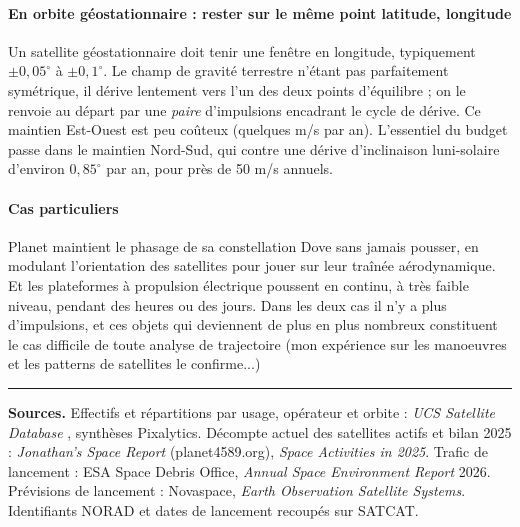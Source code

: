 \documentclass[11pt]{article}
\begin{document}
\paragraph{En orbite géostationnaire : rester sur le même point latitude, longitude} Un satellite géostationnaire doit tenir une fenêtre en longitude, typiquement $\pm 0{,}05^\circ$ à $\pm 0{,}1^\circ$. 
Le champ de gravité terrestre n'étant pas parfaitement symétrique, il dérive lentement vers l'un des deux points d'équilibre ; on le renvoie au départ par une \emph{paire} d'impulsions encadrant le cycle de dérive. Ce maintien Est-Ouest est peu coûteux (quelques m/s par an). L'essentiel du budget passe dans le maintien Nord-Sud, qui contre une dérive d'inclinaison luni-solaire d'environ $0{,}85^\circ$ par an, pour près de 50 m/s annuels.

\paragraph{Cas particuliers} 
Planet maintient le phasage de sa constellation Dove sans jamais pousser, en modulant l'orientation des satellites pour jouer sur leur traînée aérodynamique. 
Et les plateformes à propulsion électrique poussent en continu, à très faible niveau, pendant des heures ou des jours. 
Dans les deux cas il n'y a plus d'impulsions, et ces objets qui deviennent de plus en plus nombreux constituent le cas difficile de toute analyse de trajectoire (mon expérience sur les manoeuvres et les patterns de satellites le confirme...)

\vspace{0.6em}
\noindent\rule{\textwidth}{0.4pt}
\footnotesize
\textbf{Sources.} Effectifs et répartitions par usage, opérateur et orbite : \emph{UCS Satellite Database} , synthèses Pixalytics. Décompte actuel des satellites actifs et bilan 2025 : \emph{Jonathan's Space Report} (planet4589.org), \emph{Space Activities in 2025}. Trafic de lancement : ESA Space Debris Office, \emph{Annual Space Environment Report} 2026. Prévisions de lancement : Novaspace, \emph{Earth Observation Satellite Systems}. Identifiants NORAD et dates de lancement recoupés sur SATCAT.
\end{document}
